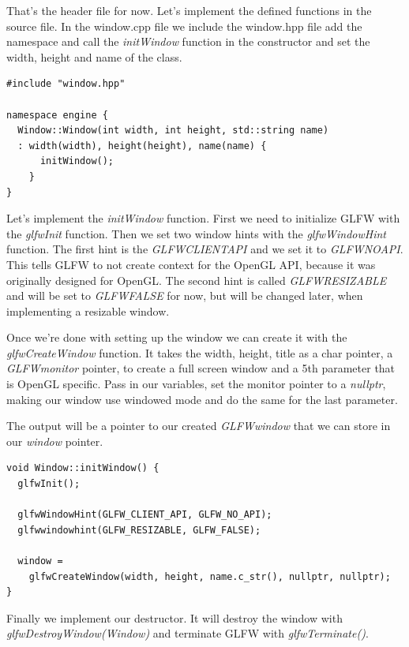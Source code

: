 \documentclass[12pt]{report} \usepackage{preamble}
\begin{document}
That's the header file for now. Let's implement the defined functions in the source file.
In the window.cpp file we include the window.hpp file add the namespace and
call the \textit{initWindow} function in the constructor and set the width, height and name of the class.

\begin{lstlisting}[Language=C++]
#include "window.hpp"

namespace engine {
  Window::Window(int width, int height, std::string name)
  : width(width), height(height), name(name) {
      initWindow();
    }
}
\end{lstlisting}

Let's implement the \textit{initWindow} function. First we need to initialize \ac{GLFW} with the
\textit{glfwInit} function. Then we set two window hints with the \textit{glfwWindowHint} function.
The first hint is the \textit{GLFW\textunderscore CLIENT\textunderscore API} and we set it to
\textit{GLFW\textunderscore NO\textunderscore API}. This tells
\ac{GLFW} to not create context for the OpenGL \ac{API}, because it was originally designed for OpenGL. \cite{client-api-hint}
The second hint is called \textit{GLFW\textunderscore RESIZABLE} and will be set to \textit{GLFW\textunderscore FALSE}
for now, but will be changed later, when implementing a resizable window.

Once we're done with setting up the window we can create it with the \textit{glfwCreateWindow} function.
It takes the width, height, title as a char pointer, a \textit{GLFWmonitor} pointer, to create a full screen
window and a 5th parameter that is OpenGL specific. Pass in our variables, set the monitor pointer to a
\textit{nullptr}, making our window use windowed mode and do the same for the last parameter.

The output will be a pointer to our created \textit{GLFWwindow} that we can store in our \textit{window}
pointer.

\begin{lstlisting}[Language=C++] 
void Window::initWindow() {
  glfwInit();

  glfwWindowHint(GLFW_CLIENT_API, GLFW_NO_API);
  glfwwindowhint(GLFW_RESIZABLE, GLFW_FALSE);

  window = 
    glfwCreateWindow(width, height, name.c_str(), nullptr, nullptr);
}
\end{lstlisting}

Finally we implement our destructor. It will destroy the window with \textit{glfwDestroyWindow(Window)}
and terminate \ac{GLFW} with \textit{glfwTerminate()}.
\end{document}
